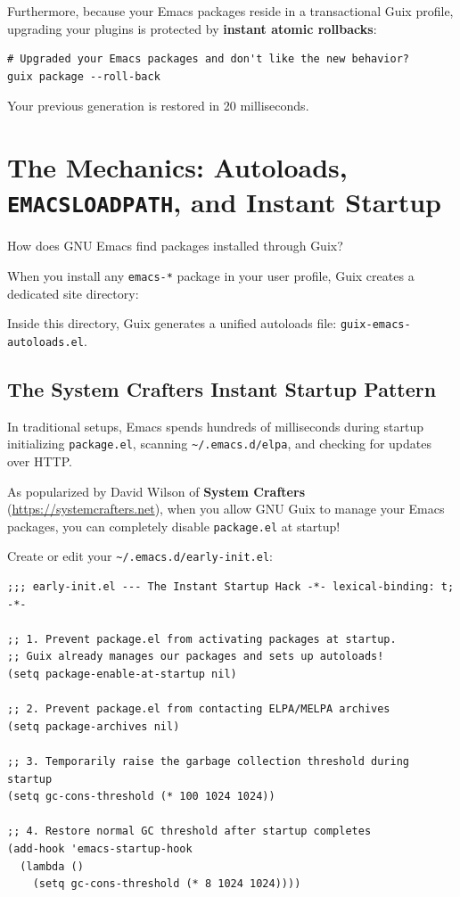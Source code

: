 Furthermore, because your Emacs packages reside in a transactional Guix profile, upgrading your plugins is protected by \textbf{instant atomic rollbacks}:
\begin{lstlisting}[style=guixcli]
# Upgraded your Emacs packages and don't like the new behavior?
guix package --roll-back
\end{lstlisting}
Your previous generation is restored in 20 milliseconds.

\section{The Mechanics: Autoloads, \texttt{EMACSLOADPATH}, and Instant Startup}

How does GNU Emacs find packages installed through Guix?

When you install any \texttt{emacs-*} package in your user profile, Guix creates a dedicated site directory:
\begin{center}
\end{center}
Inside this directory, Guix generates a unified autoloads file: \texttt{guix-emacs-autoloads.el}.

\subsection{The System Crafters Instant Startup Pattern}

In traditional setups, Emacs spends hundreds of milliseconds during startup initializing \texttt{package.el}, scanning \texttt{\textasciitilde/.emacs.d/elpa}, and checking for updates over HTTP.

As popularized by David Wilson of \textbf{System Crafters} (\url{https://systemcrafters.net}), when you allow GNU Guix to manage your Emacs packages, you can completely disable \texttt{package.el} at startup!

Create or edit your \texttt{\textasciitilde/.emacs.d/early-init.el}:

\begin{lstlisting}[style=guixscheme]
;;; early-init.el --- The Instant Startup Hack -*- lexical-binding: t; -*-

;; 1. Prevent package.el from activating packages at startup.
;; Guix already manages our packages and sets up autoloads!
(setq package-enable-at-startup nil)

;; 2. Prevent package.el from contacting ELPA/MELPA archives
(setq package-archives nil)

;; 3. Temporarily raise the garbage collection threshold during startup
(setq gc-cons-threshold (* 100 1024 1024))

;; 4. Restore normal GC threshold after startup completes
(add-hook 'emacs-startup-hook
  (lambda ()
    (setq gc-cons-threshold (* 8 1024 1024))))
\end{lstlisting}


